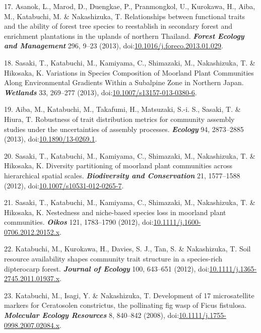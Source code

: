 \documentclass[
]{article}
\newenvironment{cslreferences}%
  {}%
  {\par}
\begin{document}
\begin{cslreferences}
\leavevmode\hypertarget{ref-Asanok2013}{}%
17. Asanok, L., Marod, D., Duengkae, P., Pranmongkol, U., Kurokawa, H.,
Aiba, M., Katabuchi, M. \& Nakashizuka, T. Relationships between
functional traits and the ability of forest tree species to reestablish
in secondary forest and enrichment plantations in the uplands of
northern Thailand. \emph{\textbf{Forest Ecology and Management}} 296,
9--23 (2013),
doi:\href{https://doi.org/10.1016/j.foreco.2013.01.029}{10.1016/j.foreco.2013.01.029}.

\leavevmode\hypertarget{ref-Sasaki2013}{}%
18. Sasaki, T., Katabuchi, M., Kamiyama, C., Shimazaki, M., Nakashizuka,
T. \& Hikosaka, K. Variations in Species Composition of Moorland Plant
Communities Along Environmental Gradients Within a Subalpine Zone in
Northern Japan. \emph{\textbf{Wetlands}} 33, 269--277 (2013),
doi:\href{https://doi.org/10.1007/s13157-013-0380-6}{10.1007/s13157-013-0380-6}.

\leavevmode\hypertarget{ref-Aiba2013}{}%
19. Aiba, M., Katabuchi, M., Takafumi, H., Matsuzaki, S.-i. S., Sasaki,
T. \& Hiura, T. Robustness of trait distribution metrics for community
assembly studies under the uncertainties of assembly processes.
\emph{\textbf{Ecology}} 94, 2873--2885 (2013),
doi:\href{https://doi.org/10.1890/13-0269.1}{10.1890/13-0269.1}.

\leavevmode\hypertarget{ref-Sasaki2012b}{}%
20. Sasaki, T., Katabuchi, M., Kamiyama, C., Shimazaki, M., Nakashizuka,
T. \& Hikosaka, K. Diversity partitioning of moorland plant communities
across hierarchical spatial scales. \emph{\textbf{Biodiversity and
Conservation}} 21, 1577--1588 (2012),
doi:\href{https://doi.org/10.1007/s10531-012-0265-7}{10.1007/s10531-012-0265-7}.

\leavevmode\hypertarget{ref-Sasaki2012}{}%
21. Sasaki, T., Katabuchi, M., Kamiyama, C., Shimazaki, M., Nakashizuka,
T. \& Hikosaka, K. Nestedness and niche-based species loss in moorland
plant communities. \emph{\textbf{Oikos}} 121, 1783--1790 (2012),
doi:\href{https://doi.org/10.1111/j.1600-0706.2012.20152.x}{10.1111/j.1600-0706.2012.20152.x}.

\leavevmode\hypertarget{ref-Katabuchi2012}{}%
22. Katabuchi, M., Kurokawa, H., Davies, S. J., Tan, S. \& Nakashizuka,
T. Soil resource availability shapes community trait structure in a
species-rich dipterocarp forest. \emph{\textbf{Journal of Ecology}} 100,
643--651 (2012),
doi:\href{https://doi.org/10.1111/j.1365-2745.2011.01937.x}{10.1111/j.1365-2745.2011.01937.x}.

\leavevmode\hypertarget{ref-Katabuchi2008b}{}%
23. Katabuchi, M., Isagi, Y. \& Nakashizuka, T. Development of 17
microsatellite markers for Ceratosolen constrictus, the pollinating fig
wasp of Ficus fistulosa. \emph{\textbf{Molecular Ecology Resources}} 8,
840--842 (2008),
doi:\href{https://doi.org/10.1111/j.1755-0998.2007.02084.x}{10.1111/j.1755-0998.2007.02084.x}.


\end{cslreferences}
\end{document}
